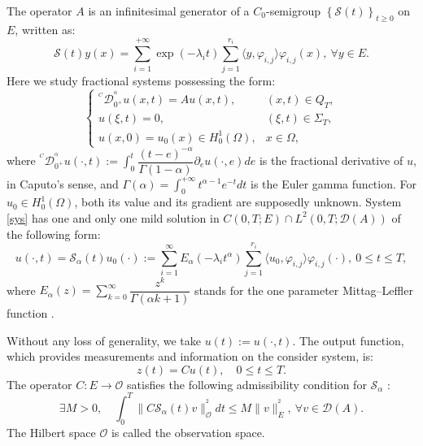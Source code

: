 \documentclass{article}
\begin{document}
The operator $A$ is an infinitesimal generator of a $C_0$-semigroup 
$\left\{\mathcal{S}(t)\right\}_{t\geq 0}$ on $E$, written as:
\begin{equation}
\label{S.G}
\mathcal{S}(t)y(x) = \displaystyle\sum_{i=1}^{+\infty}\exp(-\lambda_it)
\sum_{j=1}^{r_i}\langle y,\varphi_{i,j}\rangle\varphi_{i,j}(x), 
\ \forall y\in E.
\end{equation}
Here we study fractional systems possessing the form:
\begin{equation}
\label{sys}
\left\{\begin{array}{llll}
^{^C}\mathcal{D}_{0^+}^{^\alpha}u(x,t) =  Au(x,t),  
& (x,t)\in Q_T, \\ 
u(\xi,t) = 0,  & (\xi,t)\in \Sigma_T, \\
u(x,0) = u_0(x)\in H^1_0(\Omega),  
& x\in\Omega,
\end{array}\right.
\end{equation}
where 
$^{^C}\mathcal{D}_{0^+}^{^\alpha}u(\cdot,t) 
:= \displaystyle\int_{0}^{t}\dfrac{(t-e)^{-\alpha}}{\Gamma(1-\alpha)}
\partial_e u(\cdot,e)de$ is the fractional derivative of $u$, in Caputo's 
sense, and $\Gamma(\alpha) = \displaystyle\int_{0}^{+\infty}t^{\alpha-1}e^{-t}dt$ 
is the Euler gamma function. For $u_0\in H^1_0(\Omega)$, both its value and its 
gradient are supposedly unknown. System \eqref{sys} has one and only one 
mild solution in $C(0,T;E)\cap L^2(0,T;\mathcal{D}(A))$ of the following form: 
\begin{equation}
\label{sol}
u(\cdot,t) = \mathcal{S}_\alpha(t)u_0(\cdot) 
:= \displaystyle\sum_{i=1}^{\infty}
E_\alpha(-\lambda_it^\alpha)\sum_{j=1}^{r_i}\langle u_0,
\varphi_{i,j}\rangle\varphi_{i,j}(\cdot), \ 0\leq t\leq T,
\end{equation}
where $E_\alpha(z) = \displaystyle
\sum_{k=0}^{\infty}\dfrac{z^k}{\Gamma(\alpha k+1)}$ 
stands for the one parameter Mittag--Leffler function \cite{Yam1}.

Without any loss of generality, we take $u(t) := u(\cdot,t)$.
The output function, which provides measurements 
and information on the consider system, is:
\begin{equation}
\label{out}
z(t) = Cu(t), \quad 0\leq t\leq T.
\end{equation}
The operator $C: E \rightarrow \mathcal{O}$ satisfies the following 
admissibility condition for $\mathcal{S}_\alpha$ \cite{zguaid.2021}:
\begin{equation}
\label{adm.cnd}
\exists M>0, \quad \displaystyle\int_{0}^{T}\|C
\mathcal{S}_\alpha(t)v\|_{\mathcal{O}}^{^2}dt 
\leq M\|v\|_{E}^{^2}, \  \forall v\in\mathcal{D}(A).
\end{equation}
The Hilbert space $\mathcal{O}$ is called the observation space.
\end{document}
